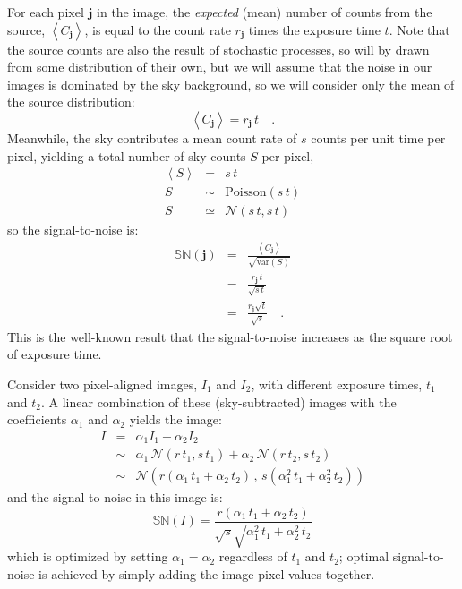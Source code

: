 \documentclass[letterpaper,preprint]{aastex}
\newcommand{\var}[1]{\mathrm{Var}({#1})}
\newcommand{\drawnfrom}{\sim}
\newcommand{\gaussianN}{\mathcal{N}}
\newcommand{\gaussian}[1]{\gaussianN\!\left(#1\right)}
\newcommand{\snr}[1]{\mathbb{SN}(#1)}
\newcommand{\expect}[1]{\left\langle #1 \right\rangle}
\renewcommand{\var}[1]{\mathrm{var}\left( #1 \right)}
\renewcommand{\vec}[1]{\boldsymbol{#1}}
\newcommand{\jvec}{\vec{j}}
\begin{document}
For each pixel $\jvec$ in the image, the \emph{expected} (mean) number
of counts from the source, $\expect{C_{\jvec}}$, is equal to the count
rate $r_{\jvec}$ times the exposure time $t$.  Note that the source
counts are also the result of stochastic processes, so will by drawn
from some distribution of their own, but we will assume that the noise
in our images is dominated by the sky background, so we will consider
only the mean of the source distribution:
\begin{equation}
\expect{C_{\jvec}} = r_{\jvec} \, t \quad .
\end{equation}
Meanwhile, the sky contributes a mean count rate of $s$ counts per
unit time per pixel, yielding a total number of sky counts $S$ per
pixel,
\begin{eqnarray}
\expect{S} &=& s \, t \\
S & \drawnfrom & \mathrm{Poisson}(s \, t) \\
S & \simeq & \gaussian{s \, t, s \, t}
\end{eqnarray}
so the signal-to-noise is:
\begin{eqnarray}
\snr{\jvec} & = & \frac{\expect{C_{\jvec}}}{\sqrt{\var{S}}} \\
& = & \frac{r_{\jvec} \, t}{\sqrt{s \, t}} \\
& = & \frac{r_{\jvec} \sqrt{t}}{\sqrt{s}} \quad .
\label{eqn:snimg}
\end{eqnarray}
This is the well-known result that the signal-to-noise
increases as the square root of exposure time.


Consider two pixel-aligned images, $I_1$ and $I_2$, with different
exposure times, $t_1$ and $t_2$.  A linear combination of these
(sky-subtracted) images with the coefficients $\alpha_1$ and
$\alpha_2$ yields the image:
\begin{eqnarray}
  I &=& \alpha_1 I_1 + \alpha_2 I_2 \\
\label{eqn:imgsum}
& \drawnfrom & \alpha_1 \, \gaussian{r \, t_1, s \, t_1} + \alpha_2 \, \gaussian{r \, t_2, s \, t_2} \\
& \drawnfrom & \gaussian{r(\alpha_1 \, t_1 + \alpha_2 \, t_2) \,,\, s (\alpha_1^2 \, t_1 + \alpha_2^2 \, t_2)}
\end{eqnarray}
and the signal-to-noise in this image is:
\begin{equation}
\snr{I} = \frac{r (\alpha_1 \, t_1 + \alpha_2 \, t_2)}{\sqrt{s} \sqrt{\alpha_1^2 \, t_1 + \alpha_2^2 \, t_2}}
\end{equation}
which is optimized by setting $\alpha_1 = \alpha_2$ regardless of
$t_1$ and $t_2$; optimal signal-to-noise is achieved by simply adding
the image pixel values together.
\end{document}
